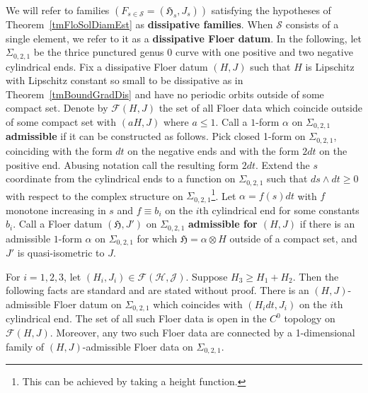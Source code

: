 \documentclass[11pt]{amsart}
\theoremstyle{definition}
\theoremstyle{remark}
\begin{document}
We will refer to families $(F_{s\in\mathcal{S}}=(\mathfrak{H}_{s},J_{s}))$ satisfying the hypotheses of Theorem~\ref{tmFloSolDiamEst} as \textbf{dissipative families}. When $\mathcal{S}$ consists of a single element, we refer to it as a \textbf{dissipative Floer datum}. In the following, let $\Sigma_{0,2,1}$ be the thrice punctured genus $0$ curve with one positive and two negative cylindrical ends. Fix a dissipative Floer datum $(H,J)$ such that $H$ is Lipschitz with Lipschitz constant so small to be dissipative as in Theorem~\ref{tmBoundGradDis} and have no periodic orbits outside of some compact set. Denote by $\mathcal{F}(H,J)$ the set of all Floer data which coincide outside of some compact set with $(aH,J)$ where $a\leq 1$. Call a $1$-form $\alpha$ on $\Sigma_{0,2,1}$ \textbf{admissible} if it can be constructed as follows. Pick closed 1-form on $\Sigma_{0,2,1}$, coinciding with the form $dt$ on the negative ends and with the form $2dt$ on the positive end. Abusing notation call the resulting form $2dt$. Extend the $s$ coordinate from the cylindrical ends to a function on $\Sigma_{0,2,1}$ such that $ds\wedge dt\geq 0$ with respect to the complex structure on $\Sigma_{0,2,1}$\footnote{This can be achieved by taking a height function.}. Let $\alpha =f(s)dt$ with $f$ monotone increasing in $s$ and $f\equiv b_i$ on the $i$th cylindrical end for some constants $b_i$. Call a Floer datum $(\mathfrak{H},J')$ on $\Sigma_{0,2,1}$ \textbf{admissible for $(H,J)$} if there is an admissible $1$-form $\alpha$ on $\Sigma_{0,2,1}$ for which $\mathfrak{H}=\alpha\otimes H$ outside of a compact set, and $J'$ is quasi-isometric to $J$.

For $i=1,2,3$, let $(H_i,J_i)\in\mathcal{F(H,J)}.$ Suppose $ H_3\geq H_1+H_2$. Then the following facts are standard and are stated without proof. There is an $(H,J)$-admissible Floer datum on $\Sigma_{0,2,1}$ which coincides with $(H_idt,J_i)$ on the $i$th cylindrical end. The set of all such Floer data is open in the $C^0$ topology on $\mathcal{F}(H,J)$. Moreover, any two such Floer data are connected by a 1-dimensional family of $(H,J)$-admissible Floer data on $\Sigma_{0,2,1}.$
\end{document}
